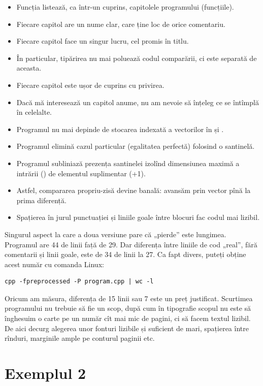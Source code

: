 \documentclass[../main.tex]{subfiles}
\begin{document}
\begin{itemize}
  \item Funcția  listează, ca într-un cuprins, capitolele programului (funcțiile).
  \item Fiecare capitol are un nume clar, care ține loc de orice comentariu.
  \item Fiecare capitol face un singur lucru, cel promis în titlu.
  \item În particular, tipărirea nu mai poluează codul comparării, ci este separată de aceasta.
  \item Fiecare capitol este ușor de cuprins cu privirea.
  \item Dacă mă interesează un capitol anume, nu am nevoie să înțeleg ce se întîmplă în celelalte.
  \item Programul nu mai depinde de stocarea indexată a vectorilor în  și .
  \item Programul elimină cazul particular (egalitatea perfectă) folosind o santinelă.
  \item Programul subliniază prezența santinelei izolînd dimensiunea maximă a intrării () de elementul suplimentar (+1).
  \item Astfel, compararea propriu-zisă devine banală: avansăm prin vector pînă la prima diferență.
  \item Spațierea în jurul punctuației și liniile goale între blocuri fac codul mai lizibil.
\end{itemize}

Singurul aspect la care a doua versiune pare că „pierde” este lungimea. Programul are 44 de linii față de 29. Dar diferența între liniile de cod „real”, fără comentarii și linii goale, este de 34 de linii la 27. Ca fapt divers, puteți obține acest număr cu comanda Linux:

\begin{verbatim}
cpp -fpreprocessed -P program.cpp | wc -l
\end{verbatim}

Oricum am măsura, diferența de 15 linii sau 7 este un preț justificat. Scurtimea programului nu trebuie să fie un scop, după cum în tipografie scopul nu este să înghesuim o carte pe un număr cît mai mic de pagini, ci să facem textul lizibil. De aici decurg alegerea unor fonturi lizibile și suficient de mari, spațierea între rînduri, marginile ample pe conturul paginii etc.


\section{Exemplul 2}
\end{document}
